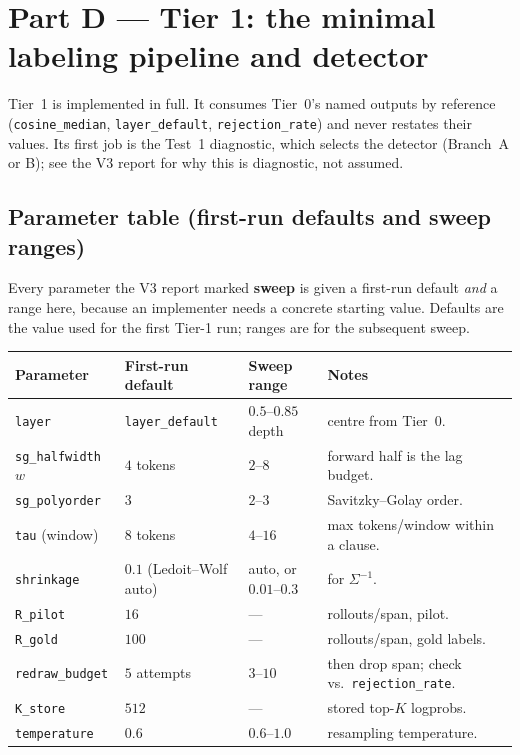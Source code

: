 \documentclass[11pt]{article}
\newcommand{\out}[1]{\texttt{#1}}      %
\newcommand{\param}[1]{\texttt{#1}}    %
\begin{document}
\section{Part D --- Tier 1: the minimal labeling pipeline and detector}
\label{sec:tier1}

Tier~1 is implemented in full. It consumes Tier~0's named outputs by reference
(\out{cosine\_median}, \out{layer\_default}, \out{rejection\_rate}) and never
restates their values. Its first job is the Test~1 diagnostic, which selects the
detector (Branch~A or B); see the V3 report for why this is diagnostic, not
assumed.

\subsection{Parameter table (first-run defaults and sweep ranges)}
\label{sec:t1-params}
Every parameter the V3 report marked \textbf{sweep} is given a first-run default
\emph{and} a range here, because an implementer needs a concrete starting value.
Defaults are the value used for the first Tier-1 run; ranges are for the
subsequent sweep.

\begin{center}\small
\begin{tabular}{@{}p{}p{}p{}p{}@{}}
\toprule
Parameter & First-run default & Sweep range & Notes \\
\midrule
\param{layer} & \out{layer\_default} & $0.5$--$0.85$ depth & centre from Tier~0. \\
\param{sg\_halfwidth} $w$ & $4$ tokens & $2$--$8$ & forward half is the lag budget. \\
\param{sg\_polyorder} & $3$ & $2$--$3$ & Savitzky--Golay order. \\
\param{tau} (window) & $8$ tokens & $4$--$16$ & max tokens/window within a clause. \\
\param{shrinkage} & $0.1$ (Ledoit--Wolf auto) & auto, or $0.01$--$0.3$ & for $\Sigma^{-1}$. \\
\param{R\_pilot} & $16$ & --- & rollouts/span, pilot. \\
\param{R\_gold} & $100$ & --- & rollouts/span, gold labels. \\
\param{redraw\_budget} & $5$ attempts & $3$--$10$ & then drop span; check vs.\ \out{rejection\_rate}. \\
\param{K\_store} & $512$ & --- & stored top-$K$ logprobs. \\
\param{temperature} & $0.6$ & $0.6$--$1.0$ & resampling temperature. \\
\bottomrule
\end{tabular}
\end{center}
\end{document}
